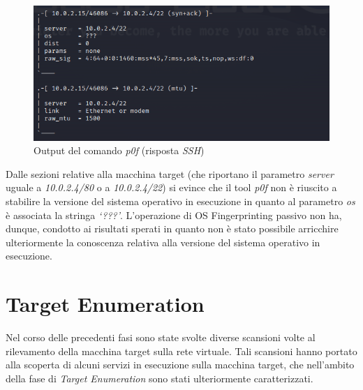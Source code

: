 \begin{figure}[h]
    \centering
    \includegraphics[scale=0.7]{capitoli/images/p0f_ssh.png}
    \caption{Output del comando \emph{p0f} (risposta \emph{SSH})}
    \label{fig:p0f_ssh}
\end{figure}
Dalle sezioni relative alla macchina target (che riportano il parametro \emph{server} uguale a \emph{10.0.2.4/80} o a \emph{10.0.2.4/22}) si evince che il tool \emph{p0f} non è riuscito a stabilire la versione del sistema operativo in esecuzione in quanto al parametro \emph{os} è associata la stringa \emph{`???'}. L'operazione di OS Fingerprinting passivo non ha, dunque, condotto ai risultati sperati in quanto non è stato possibile arricchire ulteriormente la conoscenza relativa alla versione del sistema operativo in esecuzione.  
\section{Target Enumeration} { }
Nel corso delle precedenti fasi sono state svolte diverse scansioni volte al rilevamento della macchina target sulla rete virtuale. Tali scansioni hanno portato alla scoperta di alcuni servizi in esecuzione sulla macchina target, che nell'ambito della fase di \emph{Target Enumeration} sono stati ulteriormente caratterizzati. 
